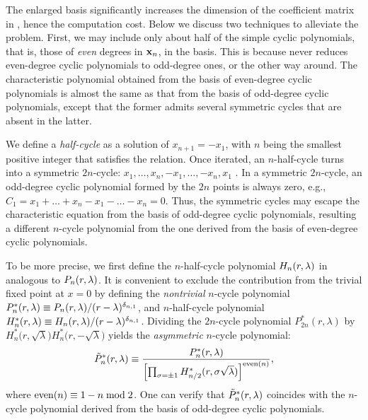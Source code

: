 \documentclass{ws-ijbc}
\begin{document}
The enlarged basis significantly increases the dimension of
  the coefficient matrix in , hence the computation cost.
%
Below we discuss two techniques to alleviate the problem.
%
First, we may include only about half of the simple cyclic polynomials,
  that is, those of \emph{even} degrees in $\mathbf{x}_{n}$, in the basis.
%
This is because  %
  never reduces even-degree cyclic polynomials to odd-degree ones,
  or the other way around.
%
The characteristic polynomial obtained
  from the basis of even-degree cyclic polynomials
  is almost the same as that
  from the basis of odd-degree cyclic polynomials,
except that the former admits several symmetric cycles
  that are absent in the latter.



We define a \emph{half-cycle} as a solution of $x_{n+1} = -x_1$,
  with $n$ being the smallest positive integer that satisfies
  the relation.
%
Once iterated, an $n$-half-cycle turns into a symmetric $2n$-cycle:
$x_1, \ldots, x_{n}, -x_1, \ldots, -x_{n}, x_1$ \cite{hao}.
%
In a symmetric $2n$-cycle,
  an odd-degree cyclic polynomial formed by the $2n$ points
  is always zero,
  e.g., $C_1 = x_1 + \dots + x_n - x_1 - \dots - x_n = 0$.
%
Thus, the symmetric cycles may escape the characteristic equation
  from the basis of odd-degree cyclic polynomials,
  resulting a different $n$-cycle polynomial from
  the one derived from the basis of even-degree cyclic polynomials.


To be more precise, we first define the $n$-half-cycle polynomial $H_n(r, \lambda)$
  in analogous to $P_n(r, \lambda)$.
%
It is convenient to exclude the contribution
  from the trivial fixed point at $x = 0$
  by defining the \emph{nontrivial} $n$-cycle polynomial
  $P^*_n(r, \lambda) \equiv P_n(r, \lambda)/(r-\lambda)^{\delta_{n,1}}$,
  and %
  $n$-half-cycle polynomial
  $H^*_n(r, \lambda) \equiv H_n(r, \lambda)/(r-\lambda)^{\delta_{n,1}}$.
%
Dividing the $2n$-cycle polynomial
  $P^{*}_{2n}(r, \lambda)$
  by
  $H^{*}_{n}\big(r, \sqrt \lambda\big)
   H^{*}_{n}\big(r, -\sqrt \lambda\big)$
%
yields the \emph{asymmetric} $n$-cycle polynomial:
\begin{equation}
\tilde P^*_n(r, \lambda) \equiv
  \frac{
    P^*_n(r, \lambda)
  }
  {
    \left[
    \prod_{\sigma = \pm 1}
      H^*_{n/2}(r, \sigma \sqrt\lambda)
    \right]^{\mathrm{even}(n)}
  },
\label{eq:Pasym}
\end{equation}
where $\mathrm{even}(n) \equiv 1 - n\bmod 2$.
%
One can verify that $\tilde P^*_n(r, \lambda)$ coincides with the $n$-cycle polynomial
  derived from the basis of odd-degree cyclic polynomials.
%
\end{document}
